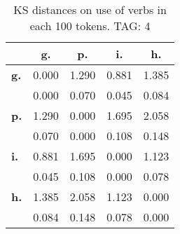 \begin{table}[h!]
\begin{center}
\begin{tabular}{| l || c | c | c | c |}\hline
 & {\bf g.} & {\bf p.} & {\bf i.} & {\bf h.} \\\hline\hline
{\bf g.} & 0.000 & 1.290 & 0.881 & 1.385 \\
{\bf } & 0.000 & 0.070 & 0.045 & 0.084 \\\hline
{\bf p.} & 1.290 & 0.000 & 1.695 & 2.058 \\
{\bf } & 0.070 & 0.000 & 0.108 & 0.148 \\\hline
{\bf i.} & 0.881 & 1.695 & 0.000 & 1.123 \\
{\bf } & 0.045 & 0.108 & 0.000 & 0.078 \\\hline
{\bf h.} & 1.385 & 2.058 & 1.123 & 0.000 \\
{\bf } & 0.084 & 0.148 & 0.078 & 0.000 \\\hline
\end{tabular}
\caption{KS distances on use of verbs in each 100 tokens. TAG: 4}
\end{center}
\end{table}